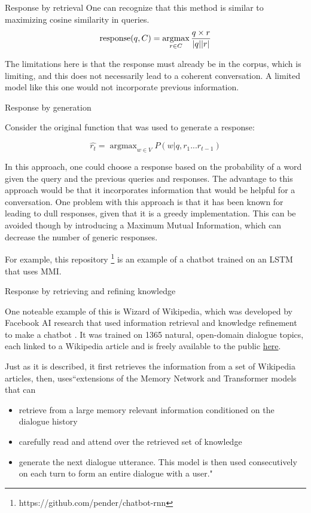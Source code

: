 \documentclass[10pt]{beamer}
\DeclareMathOperator*{\argmax}{argmax} %
\begin{document}
\begin{frame}{Response by retrieval}
One can recognize that this method is similar to maximizing cosine similarity in queries. \\

\[
\textnormal{response}(q, C) = \argmax_{r \in C} \frac{q \times r}{|q||r|}
\]

The limitations here is that the response must already be in the corpus, which is limiting, and this does not necessarily lead to a coherent conversation.  A limited model like this one would not incorporate previous information.



\end{frame}

\begin{frame}{Response by generation}

Consider the original function that was used to generate a response:

\[
\hat{r_t} = \argmax_{w\in V} P(w|q, r_1...r_{t - 1})
\]

In this approach, one could choose a response based on the probability of a word given the query and the previous queries and responses.  The advantage to this approach would be that it incorporates information that would be helpful for a conversation.  One problem with this approach is that it has been known for leading to dull responses, given that it is a greedy implementation.  This can be avoided though by introducing a Maximum Mutual Information, which can decrease the number of generic responses.

For example, this repository \footnote{https://github.com/pender/chatbot-rnn} is an example of a chatbot trained on an LSTM that uses MMI.

\end{frame}

\begin{frame}{Response by retrieving and refining knowledge}

One noteable example of this is Wizard of Wikipedia, which was developed by Facebook AI research that used information retrieval and knowledge refinement to make a chatbot \cite{wiki}.  It was trained on 1365 natural, open-domain dialogue topics, each linked to a Wikipedia article and is freely available to the public \href{https://github.com/facebookresearch/ParlAI/tree/main/projects/wizard_of_wikipedia}{here}.  

Just as it is described, it first retrieves the information from a set of Wikipedia articles, then, uses``extensions of the Memory Network and Transformer models that can 
\begin{itemize}
    \item retrieve from a
large memory relevant information conditioned on the dialogue history
\item carefully read and attend
over the retrieved set of knowledge
\item generate the next dialogue utterance. This model
is then used consecutively on each turn to form an entire dialogue with a user."
\end{itemize}
\end{frame}
\end{document}

